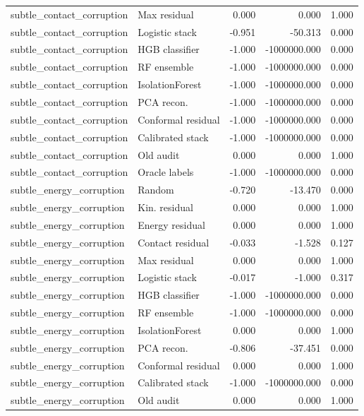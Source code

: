 {\begin{longtable}{llrrr}
subtle\_contact\_corruption & Max residual & 0.000 & 0.000 & 1.000 \\
subtle\_contact\_corruption & Logistic stack & -0.951 & -50.313 & 0.000 \\
subtle\_contact\_corruption & HGB classifier & -1.000 & -1000000.000 & 0.000 \\
subtle\_contact\_corruption & RF ensemble & -1.000 & -1000000.000 & 0.000 \\
subtle\_contact\_corruption & IsolationForest & -1.000 & -1000000.000 & 0.000 \\
subtle\_contact\_corruption & PCA recon. & -1.000 & -1000000.000 & 0.000 \\
subtle\_contact\_corruption & Conformal residual & -1.000 & -1000000.000 & 0.000 \\
subtle\_contact\_corruption & Calibrated stack & -1.000 & -1000000.000 & 0.000 \\
subtle\_contact\_corruption & Old audit & 0.000 & 0.000 & 1.000 \\
subtle\_contact\_corruption & Oracle labels & -1.000 & -1000000.000 & 0.000 \\
subtle\_energy\_corruption & Random & -0.720 & -13.470 & 0.000 \\
subtle\_energy\_corruption & Kin. residual & 0.000 & 0.000 & 1.000 \\
subtle\_energy\_corruption & Energy residual & 0.000 & 0.000 & 1.000 \\
subtle\_energy\_corruption & Contact residual & -0.033 & -1.528 & 0.127 \\
subtle\_energy\_corruption & Max residual & 0.000 & 0.000 & 1.000 \\
subtle\_energy\_corruption & Logistic stack & -0.017 & -1.000 & 0.317 \\
subtle\_energy\_corruption & HGB classifier & -1.000 & -1000000.000 & 0.000 \\
subtle\_energy\_corruption & RF ensemble & -1.000 & -1000000.000 & 0.000 \\
subtle\_energy\_corruption & IsolationForest & 0.000 & 0.000 & 1.000 \\
subtle\_energy\_corruption & PCA recon. & -0.806 & -37.451 & 0.000 \\
subtle\_energy\_corruption & Conformal residual & 0.000 & 0.000 & 1.000 \\
subtle\_energy\_corruption & Calibrated stack & -1.000 & -1000000.000 & 0.000 \\
subtle\_energy\_corruption & Old audit & 0.000 & 0.000 & 1.000 \\

\end{longtable}}
